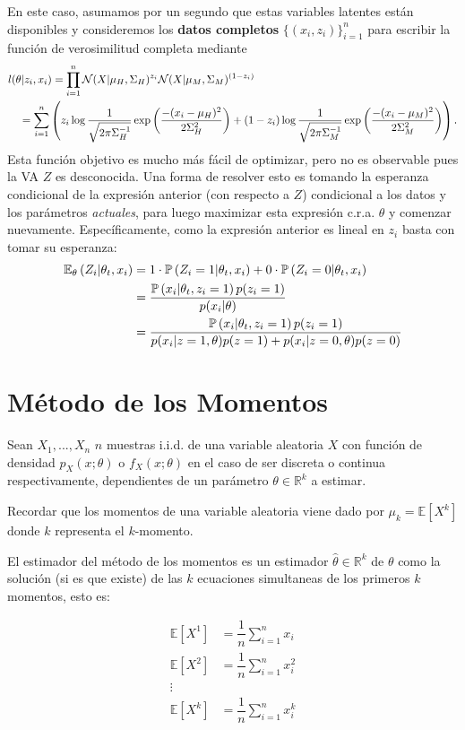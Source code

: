 En este caso, asumamos por un segundo que estas variables latentes están disponibles y consideremos los \textbf{datos completos} $\{(x_i,z_i)\}_{i=1}^n$ para escribir la función de verosimilitud completa mediante
\begin{align*}
	l(\theta|z_i,x_i) &= \prod_{i=1}^n \cN(X|\mu_H,\Sigma_H)^{z_i} \cN(X|\mu_M,\Sigma_M)^{(1-z_i)}\\
	&\hspace{-3em}= \sum_{i=1}^n \left( z_i\log\frac{1}{\sqrt{2\pi\Sigma_H^{-1}}}\expo{\frac{-(x_i-\mu_H)^2}{2\Sigma^2_H}} + (1-z_i)\log\frac{1}{\sqrt{2\pi\Sigma_M^{-1}}}\expo{\frac{-(x_i-\mu_M)^2}{2\Sigma^2_M}}\right).
\end{align*}
Esta función objetivo es mucho más fácil de optimizar, pero no es observable pues la VA $Z$ es desconocida. Una forma de resolver esto es tomando la esperanza condicional de la expresión anterior (con respecto a $Z$) condicional a los datos y los parámetros \textit{actuales}, para luego maximizar esta expresión c.r.a. $\theta$ y comenzar nuevamente. Específicamente, como la expresión anterior es lineal en $z_i$ basta con tomar su esperanza: 
\begin{align*}
	\mathbb{E}_\theta \left(Z_i|\theta_t,x_i\right) &= 1\cdot\mathbb{P} \left(Z_i=1|\theta_t,x_i\right) + 0\cdot\mathbb{P} \left(Z_i=0|\theta_t,x_i\right)\\
	&= 	\frac{\mathbb{P} \left(x_i|\theta_t,z_i=1\right) p(z_i=1)}{p(x_i|\theta)}\\
	&= 	\frac{\mathbb{P} \left(x_i|\theta_t,z_i=1\right) p(z_i=1)}{p(x_i|z=1,\theta)p(z=1)+p(x_i|z=0	,\theta)p(z=0)}
\end{align*}

\section{Método de los Momentos}

Sean $X_1,...,X_n$ $n$ muestras i.i.d. de una variable aleatoria $X$ con función de densidad $p_X(x;\theta)$ o $f_X(x;\theta)$ en el caso de ser discreta o continua respectivamente, dependientes de un parámetro $\theta\in\mathbb{R}^k$ a estimar.

Recordar que los momentos de una variable aleatoria viene dado por $\mu_k=\mathbb{E}[X^k]$ donde $k$ representa el $k$-momento.

El estimador del método de los momentos es un estimador $\hat{\theta}\in\mathbb{R}^k$ de $\theta$ como la solución (si es que existe) de las $k$ ecuaciones simultaneas de los primeros $k$ momentos, esto es:

\begin{align*}
    \mathbb{E}[X^1]&=\dfrac{1}{n}\sum\limits_{i=1}^{n}x_i\\
    \mathbb{E}[X^2]&=\dfrac{1}{n}\sum\limits_{i=1}^{n}x_i^2\\
    \vdots\\
    \mathbb{E}[X^k]&=\dfrac{1}{n}\sum\limits_{i=1}^{n}x_i^k\\
\end{align*}

